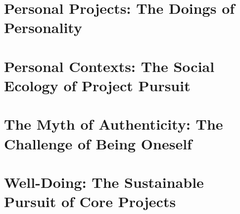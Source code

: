 \documentclass{article}
\numberwithin{equation}{section}
\begin{document}

\section{Personal Projects: The Doings of Personality}


\section{Personal Contexts: The Social Ecology of Project Pursuit}


\section{The Myth of Authenticity: The Challenge of Being Oneself}


\section{Well-Doing: The Sustainable Pursuit of Core Projects}


\printbibliography[heading=bibintoc]
	
\end{document}
